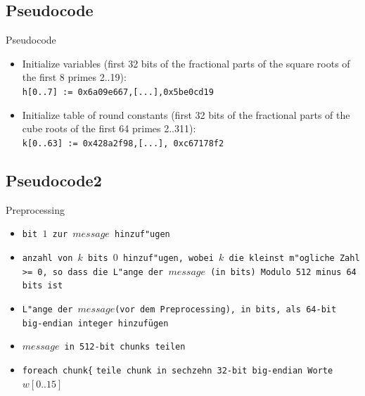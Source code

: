 \documentclass[xcolor=x11names,compress]{beamer}
\renewcommand{\(}{\begin{columns}}
\renewcommand{\)}{\end{columns}}
\newcommand{\<}[1]{\begin{column}{#1}}
\renewcommand{\>}{\end{column}}
\begin{document}
\subsection{Pseudocode}
\begin{frame}{Pseudocode}
\begin{itemize}
\item Initialize variables
(first 32 bits of the fractional parts of the square roots of the first 8 primes 2..19):\\
\texttt{h[0..7] := 0x6a09e667,[...],0x5be0cd19}
\pause
\item Initialize table of round constants
(first 32 bits of the fractional parts of the cube roots of the first 64 primes 2..311):\\
\texttt{k[0..63] := 0x428a2f98,[...], 0xc67178f2}
\end{itemize}



\end{frame}
\subsection{Pseudocode2}
\begin{frame}{Preprocessing}
\begin{itemize}
\item \texttt{bit $1$ zur $message$ hinzuf"ugen} \pause
\item \texttt{anzahl von $k$ bits $0$ hinzuf"ugen, wobei $k$ die kleinst m"ogliche Zahl >= 0, so dass die L"ange der $message$ (in bits) Modulo 512 minus 64 bits ist} \pause
\item \texttt{L"ange der $message$(vor dem Preprocessing), in bits, als 64-bit big-endian integer hinzufügen}\newline \newline \pause
\item \texttt{$message$ in 512-bit chunks teilen}
\item \texttt{foreach chunk\{}\newline
    \texttt{teile chunk in sechzehn 32-bit big-endian Worte $w[0..15]$}
\end{itemize}




\end{frame}
\end{document}
